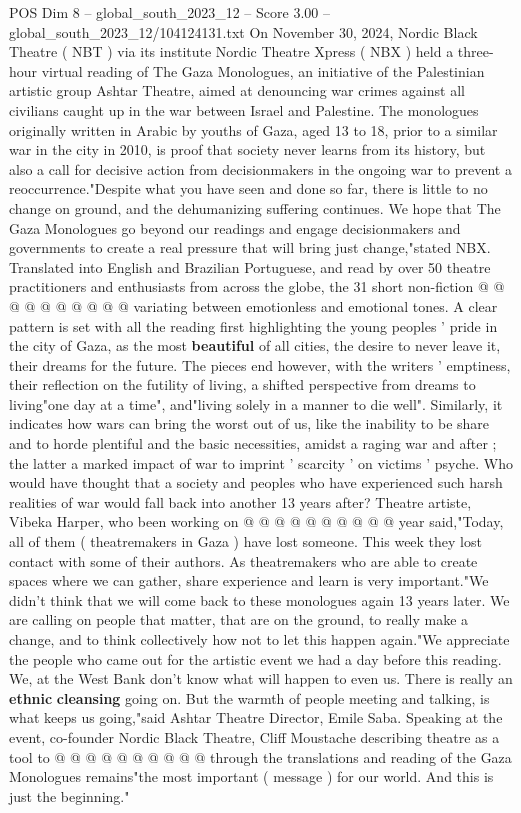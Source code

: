 \begin{textsample}{POS Dim 8 – global\_south\_2023\_12 – Score 3.00 – global\_south\_2023\_12/104124131.txt}  \label{ex:f8_pos_436}
On November 30, 2024, Nordic Black Theatre ( NBT ) via its institute Nordic Theatre Xpress ( NBX ) held a three-hour virtual reading of The Gaza Monologues, an initiative of the Palestinian artistic group Ashtar Theatre, aimed at denouncing war crimes against all civilians caught up in the war between Israel and Palestine.
The monologues originally written in Arabic by youths of Gaza, aged 13 to 18, prior to a similar war in the city in 2010, is proof that society never learns from its history, but also a call for decisive action from decisionmakers in the ongoing war to prevent a reoccurrence."Despite what you have seen and done so far, there is little to no change on ground, and the dehumanizing suffering continues.
We hope that The Gaza Monologues go beyond our readings and engage decisionmakers and governments to create a real pressure that will bring just change,"stated NBX.
Translated into English and Brazilian Portuguese, and read by over 50 theatre practitioners and enthusiasts from across the globe, the 31 short non-fiction @ @ @ @ @ @ @ @ @ @ variating between emotionless and emotional tones.
A clear pattern is set with all the reading first highlighting the young peoples ' pride in the city of Gaza, as the most \textbf{beautiful} of all cities, the desire to never leave it, their dreams for the future.
The pieces end however, with the writers ' emptiness, their reflection on the futility of living, a shifted perspective from dreams to living"one day at a time", and"living solely in a manner to die well".
Similarly, it indicates how wars can bring the worst out of us, like the inability to be share and to horde plentiful and the basic necessities, amidst a raging war and after ; the latter a marked impact of war to imprint ' scarcity ' on victims ' psyche.
Who would have thought that a society and peoples who have experienced such harsh realities of war would fall back into another 13 years after?
Theatre artiste, Vibeka Harper, who been working on @ @ @ @ @ @ @ @ @ @ year said,"Today, all of them ( theatremakers in Gaza ) have lost someone.
This week they lost contact with some of their authors.
As theatremakers who are able to create spaces where we can gather, share experience and learn is very important."We didn't think that we will come back to these monologues again 13 years later.
We are calling on people that matter, that are on the ground, to really make a change, and to think collectively how not to let this happen again."We appreciate the people who came out for the artistic event we had a day before this reading.
We, at the West Bank don't know what will happen to even us.
There is really an \textbf{ethnic} \textbf{cleansing} going on.
But the warmth of people meeting and talking, is what keeps us going,"said Ashtar Theatre Director, Emile Saba.
Speaking at the event, co-founder Nordic Black Theatre, Cliff Moustache describing theatre as a tool to @ @ @ @ @ @ @ @ @ @ through the translations and reading of the Gaza Monologues remains"the most important ( message ) for our world.
And this is just the beginning."

\end{textsample}
